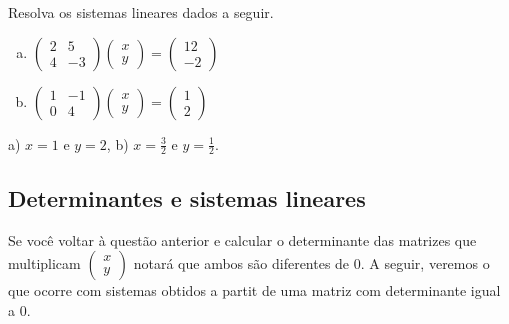 \documentclass[main.tex]{subfiles}
\begin{document}
\begin{questao}
Resolva os sistemas lineares dados a seguir.
\begin{enumerate}[a)]
\item $\begin{pmatrix}2 & 5 \\ 4 & -3\end{pmatrix} \begin{pmatrix}x \\ y\end{pmatrix} = \begin{pmatrix}12 \\ -2\end{pmatrix}$
\item $\begin{pmatrix}1 & -1 \\ 0 & 4\end{pmatrix} \begin{pmatrix}x \\ y\end{pmatrix} = \begin{pmatrix}1 \\ 2\end{pmatrix}$
\end{enumerate}
\end{questao}

\begin{gabarito}
	\begin{gabaritoQuestao}
		a) $x=1$ e $y=2$, b) $x=\frac{3}{2}$ e $y=\frac{1}{2}$.
	\end{gabaritoQuestao}
\end{gabarito}

\subsection*{Determinantes e sistemas lineares}

Se você voltar à questão anterior e calcular o determinante das matrizes que multiplicam $\begin{pmatrix}x \\ y\end{pmatrix}$ notará que ambos são diferentes de 0. A seguir, veremos o que ocorre com sistemas obtidos a partit de uma matriz com determinante igual a 0.
\end{document}
